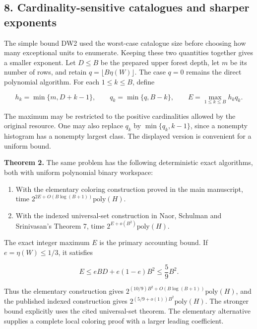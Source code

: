 \hypertarget{af-fe230a140d-cardinality-sensitive-catalogues-and-sharper-exponents}{%
\subsection{8. Cardinality-sensitive catalogues and sharper exponents}\label{af-fe230a140d-cardinality-sensitive-catalogues-and-sharper-exponents}}

The simple bound DW2 used the worst-case catalogue size before choosing how many exceptional units to enumerate. Keeping these two quantities together gives a smaller exponent. Let \(D\le B\) be the prepared upper forest depth, let \(m\) be its number of rows, and retain \(q=\lfloor B\eta(W)\rfloor\). The case \(q=0\) remains the direct polynomial algorithm. For each \(1\le k\le B\), define

\[
h_k=\min\{m,D+k-1\},
\qquad q_k=\min\{q,B-k\},
\qquad
E=\max_{1\le k\le B} h_k q_k.
\tag{DW16}
\]

The maximum may be restricted to the positive cardinalities allowed by the original resource. One may also replace \(q_k\) by \(\min\{q_k,k-1\}\), since a nonempty histogram has a nonempty largest class. The displayed version is convenient for a uniform bound.

\textbf{Theorem 2.} The same problem has the following deterministic exact algorithms, both with uniform polynomial binary workspace:

\begin{enumerate}
\def\labelenumi{\arabic{enumi}.}
\tightlist
\item
  With the elementary coloring construction proved in the main manuscript, time \(2^{2E+O(B\log(B+1))}\mathrm{poly}(H)\).
\item
  With the indexed universal-set construction in Naor, Schulman and Srinivasan's Theorem 7, time \(2^{E+o(B^2)}\mathrm{poly}(H)\).
\end{enumerate}

The exact integer maximum \(E\) is the primary accounting bound. If \(e=\eta(W)\le1/3\), it satisfies

\[
E\le eBD+e(1-e)B^2
\le\frac59 B^2.
\tag{DW17}
\]

Thus the elementary construction gives \(2^{(10/9)B^2+O(B\log(B+1))}\mathrm{poly}(H)\), and the published indexed construction gives \(2^{(5/9+o(1))B^2}\mathrm{poly}(H)\). The stronger bound explicitly uses the cited universal-set theorem. The elementary alternative supplies a complete local coloring proof with a larger leading coefficient.


